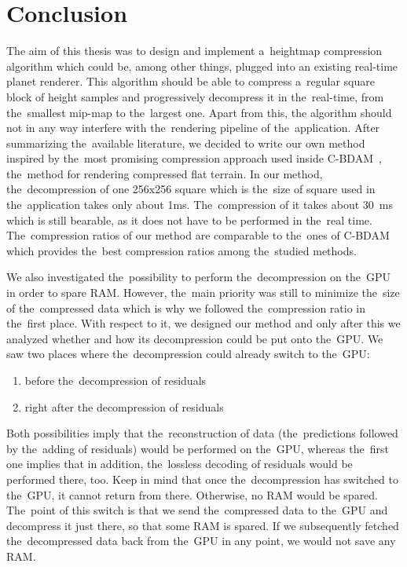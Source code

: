 \chapter{Conclusion}\label{sec:conclusion}

The aim of this thesis was to design and implement a~heightmap compression algorithm which could be, among other things, plugged into an existing real-time planet renderer. This algorithm should be able to compress a~regular square block of height samples and progressively decompress it in the~real-time, from the~smallest mip-map to the~largest one. Apart from this, the algorithm should not in any way interfere with the~rendering pipeline of the~application. After summarizing the~available literature, we decided to write our own method inspired by the~most promising compression approach used inside C-BDAM~\cite{cbdam}, the~method for rendering compressed flat terrain. In our method, the~decompression of one 256x256 square which is the~size of square used in the~application takes only about 1ms. The~compression of it takes about 30~ms which is still bearable, as it does not have to be performed in the~real time. The~compression ratios of our method are comparable to the~ones of C-BDAM which provides the~best compression ratios among the~studied methods.

We also investigated the~possibility to perform the~decompression on the~GPU in order to spare RAM. However, the~main priority was still to minimize the~size of the~compressed data which is why we followed the~compression ratio in the~first place. With respect to it, we designed our method and only after this we analyzed whether and how its decompression could be put onto the~GPU. We saw two places where the~decompression could already switch to the~GPU:
\begin{enumerate}
	\item{before the~decompression of residuals}
	\item{right after the decompression of residuals}
\end{enumerate}

Both possibilities imply that the~reconstruction of data (the~predictions followed by the~adding of residuals) would be performed on the~GPU, whereas the~first one implies that in addition, the~lossless decoding of residuals would be performed there, too. Keep in mind that once the~decompression has switched to the~GPU, it cannot return from there. Otherwise, no RAM would be spared. The~point of this switch is that we send the~compressed data to the~GPU and decompress it just there, so that some RAM is spared. If we subsequently fetched the~decompressed data back from the~GPU in any point, we would not save any RAM.

